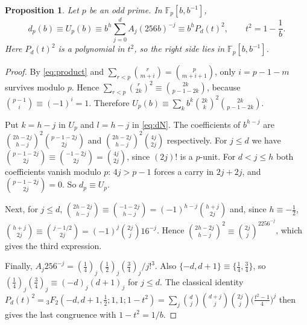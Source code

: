 \documentclass[11pt]{amsart}
\newtheorem{proposition}[theorem]{Proposition}
\theoremstyle{definition}
\theoremstyle{remark}
\newcommand{\F}{\mathbb{F}}
\begin{document}
\begin{proposition}\label{prop:hasse}
Let $p$ be an odd prime. In $\F_p[b,b^{-1}]$,
\[
 d_p(b)\equiv U_p(b)\equiv b^h\sum_{j=0}^dA_j(256b)^{-j}\equiv b^hP_d(t)^2,\qquad t^2=1-\frac1b .
\]
Here $P_d(t)^2$ is a polynomial in $t^2$, so the right side lies in $\F_p[b,b^{-1}]$.
\end{proposition}
\begin{proof}
By \eqref{eq:product} and $\sum_{r<p}\binom r{m+i}=\binom p{m+i+1}$, only
$i=p-1-m$ survives modulo $p$. Hence $\sum_{r<p}\binom r{2k}^2\equiv\binom{2k}{p-1-2k}$, because
$\binom{p-1}{i}\equiv(-1)^i=1$. Therefore
$U_p(b)\equiv\sum_kb^k\binom{2k}k^2\binom{2k}{p-1-2k}$.

Put $k=h-j$ in $U_p$ and $l=h-j$ in \eqref{eq:dN}. The coefficients of $b^{h-j}$ are
$\binom{2h-2j}{h-j}^2\binom{p-1-2j}{2j}$ and $\binom{2h-2j}{h-j}^2\binom{4j}{2j}$ respectively.
For $j\le d$ we have $\binom{p-1-2j}{2j}\equiv\binom{-1-2j}{2j}=\binom{4j}{2j}$, since $(2j)!$ is a
$p$-unit. For $d<j\le h$ both coefficients vanish modulo $p$: $4j>p-1$ forces a carry in
$2j+2j$, and $\binom{p-1-2j}{2j}=0$. So $d_p\equiv U_p$.

Next, for $j\le d$,
$\binom{2h-2j}{h-j}\equiv\binom{-1-2j}{h-j}=(-1)^{h-j}\binom{h+j}{2j}$ and, since $h\equiv-\frac12$,
$\binom{h+j}{2j}\equiv\binom{j-1/2}{2j}=(-1)^j\binom{2j}j16^{-j}$. Hence
$\binom{2h-2j}{h-j}^2\equiv\binom{2j}j^2256^{-j}$, which gives the third expression.

Finally, $A_j256^{-j}=(\frac14)_j(\frac12)_j(\frac34)_j/j!^3$. Also $\{-d,d+1\}\equiv\{\frac14,\frac34\}$,
so $(\frac14)_j(\frac34)_j\equiv(-d)_j(d+1)_j$ for $j\le d$. The classical identity
$P_d(t)^2={}_3F_2(-d,d+1,\frac12;1,1;1-t^2)
=\sum_j\binom dj\binom{d+j}j\binom{2j}j\bigl(\frac{t^2-1}4\bigr)^j$ \cite{Bailey} then gives the last
congruence with $1-t^2=1/b$.
\end{proof}
\end{document}
